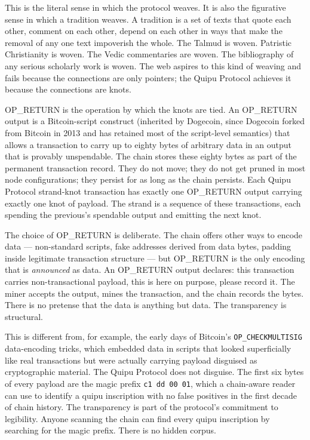 \documentclass[11pt,openany]{book}
\begin{document}
This is the literal sense in which the protocol weaves. It is also the figurative sense in which a tradition weaves. A tradition is a set of texts that quote each other, comment on each other, depend on each other in ways that make the removal of any one text impoverish the whole. The Talmud is woven. Patristic Christianity is woven. The Vedic commentaries are woven. The bibliography of any serious scholarly work is woven. The web aspires to this kind of weaving and fails because the connections are only pointers; the Quipu Protocol achieves it because the connections are knots.

OP\_RETURN is the operation by which the knots are tied. An OP\_RETURN output is a Bitcoin-script construct (inherited by Dogecoin, since Dogecoin forked from Bitcoin in 2013 and has retained most of the script-level semantics) that allows a transaction to carry up to eighty bytes of arbitrary data in an output that is provably unspendable. The chain stores these eighty bytes as part of the permanent transaction record. They do not move; they do not get pruned in most node configurations; they persist for as long as the chain persists. Each Quipu Protocol strand-knot transaction has exactly one OP\_RETURN output carrying exactly one knot of payload. The strand is a sequence of these transactions, each spending the previous's spendable output and emitting the next knot.

The choice of OP\_RETURN is deliberate. The chain offers other ways to encode data — non-standard scripts, fake addresses derived from data bytes, padding inside legitimate transaction structure — but OP\_RETURN is the only encoding that is \emph{announced} as data. An OP\_RETURN output declares: this transaction carries non-transactional payload, this is here on purpose, please record it. The miner accepts the output, mines the transaction, and the chain records the bytes. There is no pretense that the data is anything but data. The transparency is structural.

This is different from, for example, the early days of Bitcoin's \texttt{OP\_CHECKMULTISIG} data-encoding tricks, which embedded data in scripts that looked superficially like real transactions but were actually carrying payload disguised as cryptographic material. The Quipu Protocol does not disguise. The first six bytes of every payload are the magic prefix \texttt{c1 dd 00 01}, which a chain-aware reader can use to identify a quipu inscription with no false positives in the first decade of chain history. The transparency is part of the protocol's commitment to legibility. Anyone scanning the chain can find every quipu inscription by searching for the magic prefix. There is no hidden corpus.
\end{document}
